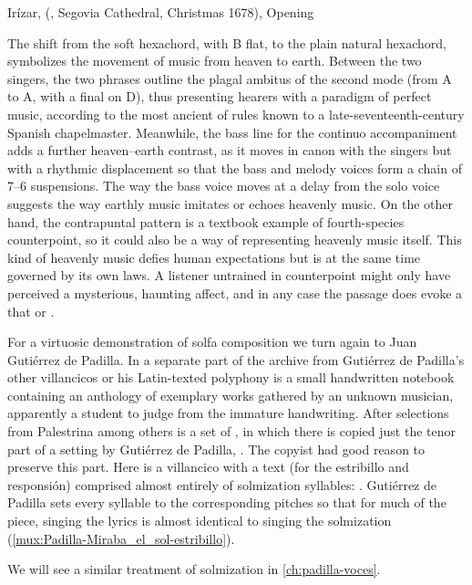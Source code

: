 {Irízar,  (, Segovia Cathedral,
Christmas 1678), Opening}

The shift from the  soft hexachord, with B flat, to the plain
natural hexachord, symbolizes the movement of music from heaven to earth.
Between the two singers, the two phrases outline the plagal ambitus of the
second mode (from A to A, with a final on D), thus presenting hearers with a
paradigm of perfect music, according to the most ancient of rules known to a
late-seventeenth-century Spanish chapelmaster.
Meanwhile, the bass line for the continuo accompaniment adds a further
heaven--earth contrast, as it moves in canon with the singers but with a
rhythmic displacement so that the bass and melody voices form a chain of 7--6
suspensions.
The way the bass voice moves at a delay from the solo voice suggests the way
earthly music imitates or echoes heavenly music.
On the other hand, the contrapuntal pattern is a textbook example of
fourth-species counterpoint, so it could also be a way of representing heavenly
music itself.  
This kind of heavenly music defies human expectations but is at the same time
governed by its own laws.
A listener untrained in counterpoint might only have perceived a mysterious,
haunting affect, and in any case the passage does evoke a  that  or .

For a virtuosic demonstration of solfa composition we turn again to Juan
Gutiérrez de Padilla.
In a separate part of the archive from Gutiérrez de Padilla's other villancicos
or his Latin-texted polyphony is a small handwritten notebook containing an
anthology of exemplary works gathered by an unknown musician, apparently a
student to judge from the immature handwriting.
After selections from Palestrina among others is a set of , in which there is copied just the tenor part of a setting
by Gutiérrez de Padilla, .%
The copyist had good reason to preserve this part.
Here is a villancico with a text (for the estribillo and responsión) comprised
almost entirely of solmization syllables:  .
Gutiérrez de Padilla sets every syllable to the corresponding pitches so that
for much of the piece, singing the lyrics is almost identical to singing the
solmization (\cref{mux:Padilla-Miraba_el_sol-estribillo}).%
\begin{Footnote}
    We will see a similar treatment of solmization in \cref{ch:padilla-voces}.
\end{Footnote}

